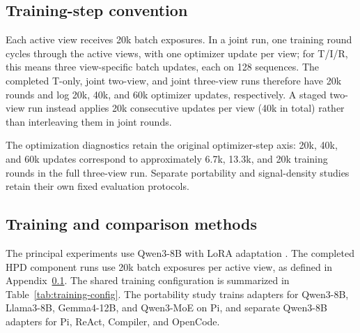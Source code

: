 \documentclass{article}
\begin{document}
\subsection{Training-step convention}
\label{app:step-accounting}

Each active view receives 20k batch exposures. In a joint run, one training
round cycles through the active views, with one optimizer update per view;
for T/I/R, this means three view-specific batch updates, each on 128
sequences. The completed T-only, joint two-view, and joint three-view runs
therefore have 20k rounds and log 20k, 40k, and 60k optimizer updates,
respectively. A staged two-view run instead applies 20k consecutive updates
per view (40k in total) rather than interleaving them in joint rounds.

The optimization diagnostics retain the original optimizer-step axis: 20k,
40k, and 60k updates correspond to approximately 6.7k, 13.3k, and 20k training
rounds in the full three-view run. Separate portability and signal-density
studies retain their own fixed evaluation protocols.

\subsection{Training and comparison methods}

The principal experiments use Qwen3-8B \citep{yang2025qwen3} with LoRA
adaptation \citep{hu2022lora}. The completed HPD component runs use 20k
batch exposures per active view, as defined in Appendix~\ref{app:step-accounting}.
The shared training configuration is summarized in
Table~\ref{tab:training-config}. The portability study
trains adapters for Qwen3-8B, Llama3-8B, Gemma4-12B, and Qwen3-MoE on
Pi, and separate Qwen3-8B adapters for Pi, ReAct, Compiler, and OpenCode.

\begin{table}[!htbp]
\centering
\small
\caption{Training platform and optimization settings shared by HPD and all
baseline training runs.}
\label{tab:training-config}
\end{table}
\end{document}
